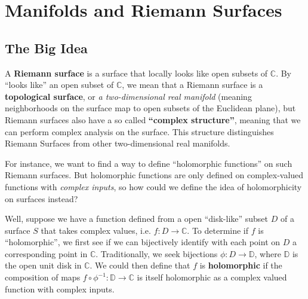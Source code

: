 \chapter{Manifolds and Riemann Surfaces}

\pagestyle{fancy}
\fancyfoot{}
\fancyhead[L]{\normalsize\textbf{\textcolor{doc}{\rightmark}}}
\fancyfoot[C]{\bfseries\color{myblue}\thepage}

\setcounter{page}{1}

\section{The Big Idea}

A \textbf{\textcolor{myblue}{Riemann surface}} is a surface that locally looks like open subsets of $\mathbb{C}$. By ``looks like'' an open subset of $\mathbb{C}$, we mean that a Riemann surface is a \textbf{\textcolor{myblue}{topological surface}}, or \textit{a two-dimensional real manifold} (meaning neighborhoods on the surface map to open subsets of the Euclidean plane), but Riemann surfaces also have a so called \textbf{\textcolor{myblue}{``complex structure''}}, meaning that we can perform complex analysis on the surface. This structure distinguishes Riemann Surfaces from other two-dimensional real manifolds. 

For instance, we want to find a way to define ``holomorphic functions'' on such Riemann surfaces. But holomorphic functions are only defined on complex-valued functions with \textit{complex inputs}, so how could we define the idea of holomorphicity on surfaces instead?

Well, suppose we have a function defined from a open ``disk-like'' subset $D$ of a surface $S$ that takes complex values, i.e. $f:D\rightarrow\mathbb{C}$. To determine if $f$ is ``holomorphic'', we first see if we can bijectively identify with each point on $D$ a corresponding point in $\mathbb{C}$. Traditionally, we seek bijections $\phi:D\to \mathbb{D}$, where $\mathbb{D}$ is the open unit disk in $\mathbb{C}$. We could then define that $f$ is \textbf{\textcolor{myblue}{holomorphic}} if the composition of maps $f\circ\phi^{-1}:\mathbb{D}\to\mathbb{C}$ is itself holomorphic as a complex valued function with complex inputs. 

